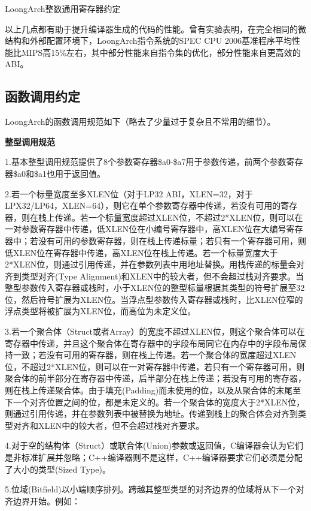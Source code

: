 \documentclass[]{ctexbook}
\begin{document}
\label{tab:la-reg}LoongArch整数通用寄存器约定

以上几点都有助于提升编译器生成的代码的性能。曾有实验表明，在完全相同的微结构和外部配置环境下，LoongArch指令系统的SPEC CPU 2006基准程序平均性能比MIPS高15\%左右，其中部分性能来自指令集的优化，部分性能来自更高效的ABI。

\hypertarget{ux51fdux6570ux8c03ux7528ux7ea6ux5b9a}{%
\subsection{函数调用约定}\label{ux51fdux6570ux8c03ux7528ux7ea6ux5b9a}}

LoongArch的函数调用规范如下（略去了少量过于复杂且不常用的细节）。

\textbf{整型调用规范}

1.基本整型调用规范提供了8个参数寄存器\$a0-\$a7用于参数传递，前两个参数寄存器\$a0和\$a1也用于返回值。

2.若一个标量宽度至多XLEN位（对于LP32 ABI，XLEN=32，对于LPX32/LP64，XLEN=64），则它在单个参数寄存器中传递，若没有可用的寄存器，则在栈上传递。若一个标量宽度超过XLEN位，不超过2*XLEN位，则可以在一对参数寄存器中传递，低XLEN位在小编号寄存器中，高XLEN位在大编号寄存器中；若没有可用的参数寄存器，则在栈上传递标量；若只有一个寄存器可用，则低XLEN位在寄存器中传递，高XLEN位在栈上传递。若一个标量宽度大于2*XLEN位，则通过引用传递，并在参数列表中用地址替换。用栈传递的标量会对齐到类型对齐(Type Alignment)和XLEN中的较大者，但不会超过栈对齐要求。当整型参数传入寄存器或栈时，小于XLEN位的整型标量根据其类型的符号扩展至32位，然后符号扩展为XLEN位。当浮点型参数传入寄存器或栈时，比XLEN位窄的浮点类型将被扩展为XLEN位，而高位为未定义位。

3.若一个聚合体（Struct或者Array）的宽度不超过XLEN位，则这个聚合体可以在寄存器中传递，并且这个聚合体在寄存器中的字段布局同它在内存中的字段布局保持一致；若没有可用的寄存器，则在栈上传递。若一个聚合体的宽度超过XLEN位，不超过2*XLEN位，则可以在一对寄存器中传递，若只有一个寄存器可用，则聚合体的前半部分在寄存器中传递，后半部分在栈上传递；若没有可用的寄存器，则在栈上传递聚合体。由于填充(Padding)而未使用的位，以及从聚合体的末尾至下一个对齐位置之间的位，都是未定义的。若一个聚合体的宽度大于2*XLEN位，则通过引用传递，并在参数列表中被替换为地址。传递到栈上的聚合体会对齐到类型对齐和XLEN中的较大者，但不会超过栈对齐要求。

4.对于空的结构体（Struct）或联合体(Union)参数或返回值，C编译器会认为它们是非标准扩展并忽略；C++编译器则不是这样，C++编译器要求它们必须是分配了大小的类型(Sized Type)。

5.位域(Bitfield)以小端顺序排列。跨越其整型类型的对齐边界的位域将从下一个对齐边界开始。例如：
\end{document}
